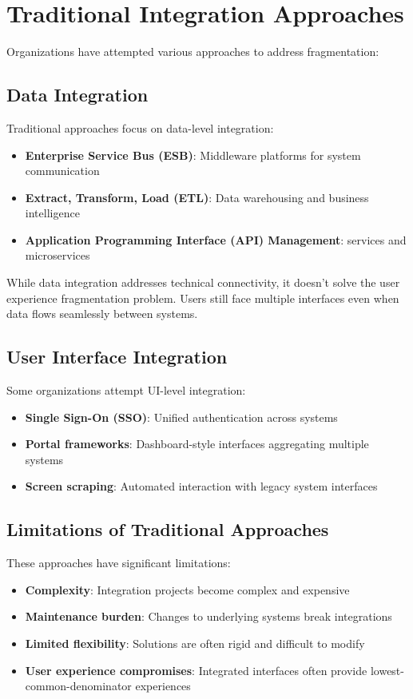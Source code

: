 \section{Traditional Integration Approaches}
\label{sec:traditional-integration}

Organizations have attempted various approaches to address fragmentation:

\subsection{Data Integration}
Traditional approaches focus on data-level integration:
\begin{itemize}
\item \textbf{Enterprise Service Bus (ESB)}: Middleware platforms for system communication
\item \textbf{Extract, Transform, Load (ETL)}: Data warehousing and business intelligence
\item \textbf{Application Programming Interface (API) Management}:  services and microservices
\end{itemize}

\begin{warningbox}
While data integration addresses technical connectivity, it doesn't solve the user experience fragmentation problem. Users still face multiple interfaces even when data flows seamlessly between systems.
\end{warningbox}

\subsection{User Interface Integration}
Some organizations attempt UI-level integration:
\begin{itemize}
\item \textbf{Single Sign-On (SSO)}: Unified authentication across systems
\item \textbf{Portal frameworks}: Dashboard-style interfaces aggregating multiple systems
\item \textbf{Screen scraping}: Automated interaction with legacy system interfaces
\end{itemize}

\subsection{Limitations of Traditional Approaches}
These approaches have significant limitations:
\begin{itemize}
\item \textbf{Complexity}: Integration projects become complex and expensive
\item \textbf{Maintenance burden}: Changes to underlying systems break integrations
\item \textbf{Limited flexibility}: Solutions are often rigid and difficult to modify
\item \textbf{User experience compromises}: Integrated interfaces often provide lowest-common-denominator experiences
\end{itemize}


